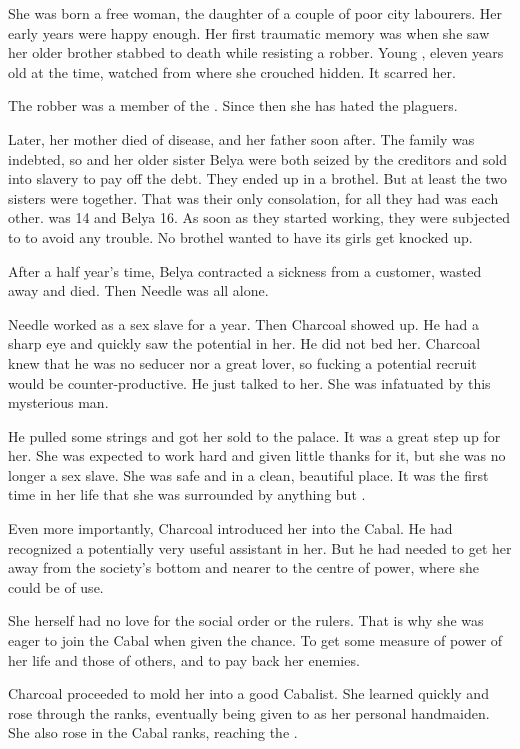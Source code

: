 She was born a free woman, the daughter of a couple of poor city labourers. 
Her early years were happy enough. 
Her first traumatic memory was when she saw her older brother stabbed to death while resisting a robber. 
Young \Piacet, eleven years old at the time, watched from where she crouched hidden. 
It scarred her. 

The robber was a member of the . 
Since then she has hated the plaguers. 

Later, her mother died of disease, and her father soon after. 
The family was indebted, so \Piacet{} and her older sister Belya were both seized by the creditors and sold into slavery to pay off the debt. 
They ended up in a brothel. 
But at least the two sisters were together. 
That was their only consolation, for all they had was each other. 
\Piacet{} was 14 and Belya 16. 
As soon as they started working, they were subjected to  to avoid any trouble. 
No brothel wanted to have its girls get knocked up. 

After a half year's time, Belya contracted a sickness from a customer, wasted away and died. 
Then Needle was all alone. 

Needle worked as a sex slave for a year. 
Then Charcoal showed up. 
He had a sharp eye and quickly saw the potential in her. 
He did not bed her. 
Charcoal knew that he was no seducer nor a great lover, so fucking a potential recruit would be counter-productive. 
He just talked to her. 
She was infatuated by this mysterious man. 

He pulled some strings and got her sold to the palace. 
It was a great step up for her. 
She was expected to work hard and given little thanks for it, but she was no longer a sex slave. 
She was safe and in a clean, beautiful place. 
It was the first time in her life that she was surrounded by anything but \squalour. 

Even more importantly, Charcoal introduced her into the Cabal. 
He had recognized a potentially very useful assistant in her. 
But he had needed to get her away from the society's bottom and nearer to the centre of power, where she could be of use. 

She herself had no love for the social order or the rulers. 
That is why she was eager to join the Cabal when given the chance. 
To get some measure of power of her life and those of others, and to pay back her enemies. 

Charcoal proceeded to mold her into a good Cabalist. 
She learned quickly and rose through the ranks, eventually being given to \Tiroco{} as her personal handmaiden. 
She also rose in the Cabal ranks, reaching the \needlecircle. 

